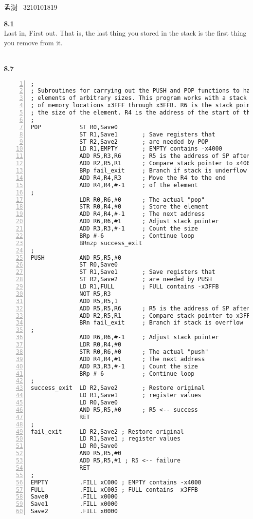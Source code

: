 \documentclass[a4paper,12pt]{article}     %
\begin{document}
\begin{center}   %
孟澍 \ 3210101819
\end{center}


\noindent %
\textbf{8.1}\\
Last in, First out. That is, the last thing you stored in the stack is the ﬁrst thing you remove from it.

~\\
\textbf{8.7}\\
\begin{Verbatim}[numbers = left]
;
; Subroutines for carrying out the PUSH and POP functions to handle
; elements of arbitrary sizes. This program works with a stack consisting
; of memory locations x3FFF through x3FFB. R6 is the stack pointer. R3 is
; the size of the element. R4 is the address of the start of the element.
;
POP           ST R0,Save0
              ST R1,Save1       ; Save registers that
              ST R2,Save2       ; are needed by POP
              LD R1,EMPTY       ; EMPTY contains -x4000
              ADD R5,R3,R6      ; R5 is the address of SP after POP
              ADD R2,R5,R1      ; Compare stack pointer to x4000
              BRp fail_exit     ; Branch if stack is underflow
              ADD R4,R4,R3      ; Move the R4 to the end
              ADD R4,R4,#-1     ; of the element
;
              LDR R0,R6,#0      ; The actual "pop"
              STR R0,R4,#0      ; Store the element
              ADD R4,R4,#-1     ; The next address
              ADD R6,R6,#1      ; Adjust stack pointer
              ADD R3,R3,#-1     ; Count the size
              BRp #-6           ; Continue loop
              BRnzp success_exit
;
PUSH          AND R5,R5,#0
              ST R0,Save0
              ST R1,Save1       ; Save registers that
              ST R2,Save2       ; are needed by PUSH
              LD R1,FULL        ; FULL contains -x3FFB
              NOT R5,R3
              ADD R5,R5,1
              ADD R5,R5,R6      ; R5 is the address of SP after PUSH
              ADD R2,R5,R1      ; Compare stack pointer to x3FFB
              BRn fail_exit     ; Branch if stack is overflow
;
              ADD R6,R6,#-1     ; Adjust stack pointer
              LDR R0,R4,#0
              STR R0,R6,#0      ; The actual "push"
              ADD R4,R4,#1      ; The next address
              ADD R3,R3,#-1     ; Count the size
              BRp #-6           ; Continue loop
;
success_exit  LD R2,Save2       ; Restore original
              LD R1,Save1       ; register values
              LD R0,Save0
              AND R5,R5,#0      ; R5 <-- success
              RET
;
fail_exit     LD R2,Save2 ; Restore original
              LD R1,Save1 ; register values
              LD R0,Save0
              AND R5,R5,#0
              ADD R5,R5,#1 ; R5 <-- failure
              RET
;
EMPTY         .FILL xC000 ; EMPTY contains -x4000
FULL          .FILL xC005 ; FULL contains -x3FFB
Save0         .FILL x0000
Save1         .FILL x0000
Save2         .FILL x0000
\end{Verbatim}
\end{document}
